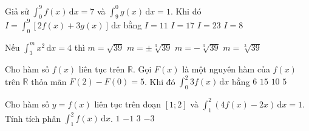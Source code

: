 \begin{ex}%
	Giả sử $\displaystyle\int_0^9{f(x)\mathrm{\,d}x}=7$ và $\displaystyle\int_9^0{g(x)\mathrm{\,d}x}=1$. Khi đó $I=\displaystyle\int_0^9{\left[2f(x)+3g(x)\right]\mathrm{\,d}x}$  bằng
	\choice 
		 {\True $I=11$}
		 {$I=17$}
		{$I=23$} 
		{$I=8$} 
\end{ex}

\begin{ex}%
	Nếu $\displaystyle\int_3^m x^2\mathrm{\,d}x =4$ thì 
	\choice 
		 {$m=\sqrt{39}$}
		{$m=\pm \sqrt[3]{39}$} 
		 {$m=-\sqrt[3]{39}$}
		{\True  $m=\sqrt[3]{39}$}
\end{ex}

\begin{ex}%
	Cho hàm số $ f(x)$ liên tục trên $\mathbb{R}$. Gọi $F(x)$ là một nguyên hàm  của $ f(x)$ trên $\mathbb{R}$ thỏa mãn $F(2)-F(0)=5$. Khi đó $\displaystyle\int_0^2{3f}(x)\mathrm{\,d}x$ bằng
	\choice 
		{$6$} 
		{\True  $15$}
		{$10$} 
		{$5$} 
\end{ex}

\begin{ex}%
	Cho hàm số $y=f(x)$ liên  tục trên đoạn $[1;2]$ và $\displaystyle \int_{1}^{2}\left(4f(x)-2x\right)\mathrm{\,d}x=1$. Tính tích phân $\displaystyle \int_{1}^{2}f(x)\mathrm{\,d}x$.
	\choice 
		{\True $1$} 
		 {$-1$}
		 {$3$}
		{$-3$} 
\end{ex}

